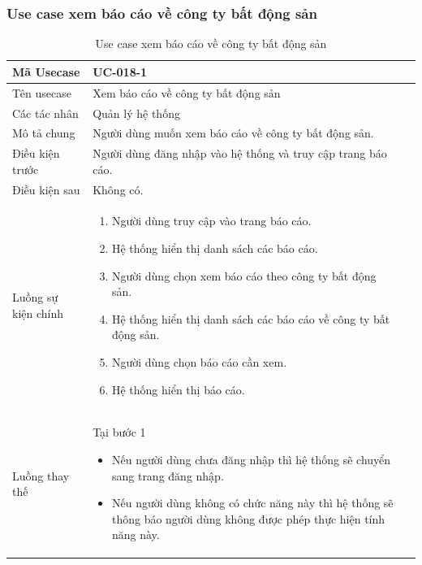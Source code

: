 \documentclass[12pt,a4paper]{article}
\begin{document}
    \subsubsection*{Use case xem báo cáo về công ty bất động sản}
    \begin{table}[H]
        \centering
        \begin{tabular}{|p{3.5cm}|p{11.5cm}|c|}
            \hline
            Mã Usecase & UC-018-1
            \\ \hline
            Tên usecase     & Xem báo cáo về công ty bất động sản                          \\
            \hline
            Các tác nhân    & Quản lý hệ thống                                             \\
            \hline
            Mô tả chung     & Người dùng muốn xem báo cáo về công ty bất động sản.         \\
            \hline

            Điều kiện trước & Người dùng đăng nhập vào hệ thống và truy cập trang báo cáo. \\
            \hline

            Điều kiện sau   & Không có.                                                    \\
            \hline

            Luồng sự kiện chính & \vspace{-.8cm}\begin{enumerate}
                                                    \item Người dùng truy cập vào trang báo cáo.
                                                    \item Hệ thống hiển thị danh sách các báo cáo.
                                                    \item Người dùng chọn xem báo cáo theo công ty bất động sản.
                                                    \item Hệ thống hiển thị danh sách các báo cáo về công ty bất động sản.
                                                    \item Người dùng chọn báo cáo cần xem.
                                                    \item Hệ thống hiển thị báo cáo.
            \end{enumerate}
            \\
            \hline
            Luồng thay thế & Tại bước 1\newline
            \vspace{-.8cm}\begin{itemize}
                              \item Nếu người dùng chưa đăng nhập thì hệ thống sẽ chuyển sang trang đăng nhập.
                              \item Nếu người dùng không có chức năng này thì hệ thống sẽ thông báo người dùng không được phép thực hiện tính năng này.
            \end{itemize}
            \\ \hline
        \end{tabular}
        \caption{Use case xem báo cáo về công ty bất động sản}


\end{table}
\end{document}
